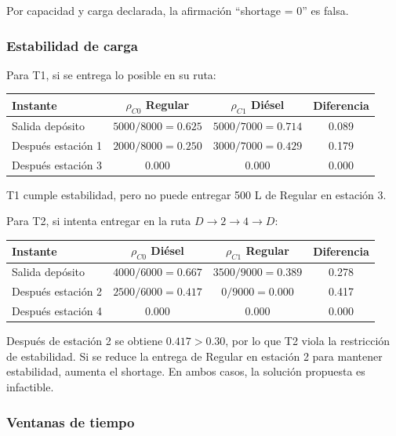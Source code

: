 \documentclass[11pt,letterpaper]{article}
\begin{document}
Por capacidad y carga declarada, la afirmación ``shortage = 0'' es falsa.

\subsubsection*{Estabilidad de carga}

Para T1, si se entrega lo posible en su ruta:

\begin{table}[h]
\centering
\begin{tabular}{lccc}
\toprule
\textbf{Instante} & \(\rho_{C0}\) Regular & \(\rho_{C1}\) Diésel & \textbf{Diferencia} \\
\midrule
Salida depósito & \(5000/8000=0.625\) & \(5000/7000=0.714\) & 0.089 \\
Después estación 1 & \(2000/8000=0.250\) & \(3000/7000=0.429\) & 0.179 \\
Después estación 3 & 0.000 & 0.000 & 0.000 \\
\bottomrule
\end{tabular}
\end{table}

T1 cumple estabilidad, pero no puede entregar 500 L de Regular en estación 3.

Para T2, si intenta entregar en la ruta \(D\to2\to4\to D\):

\begin{table}[h]
\centering
\begin{tabular}{lccc}
\toprule
\textbf{Instante} & \(\rho_{C0}\) Diésel & \(\rho_{C1}\) Regular & \textbf{Diferencia} \\
\midrule
Salida depósito & \(4000/6000=0.667\) & \(3500/9000=0.389\) & 0.278 \\
Después estación 2 & \(2500/6000=0.417\) & \(0/9000=0.000\) & 0.417 \\
Después estación 4 & 0.000 & 0.000 & 0.000 \\
\bottomrule
\end{tabular}
\end{table}

Después de estación 2 se obtiene \(0.417>0.30\), por lo que T2 viola la restricción de
estabilidad. Si se reduce la entrega de Regular en estación 2 para mantener estabilidad,
aumenta el shortage. En ambos casos, la solución propuesta es infactible.

\subsubsection*{Ventanas de tiempo}
\end{document}
